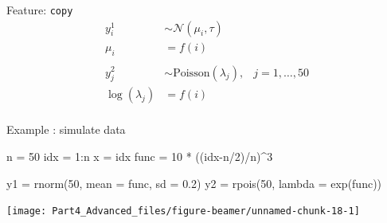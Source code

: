 \documentclass[
  ignorenonframetext,
]{beamer}
\newenvironment{Shaded}{\begin{snugshade}}{\end{snugshade}}
\newcommand{\AttributeTok}[1]{\textcolor[rgb]{0.77,0.63,0.00}{#1}}
\newcommand{\DecValTok}[1]{\textcolor[rgb]{0.00,0.00,0.81}{#1}}
\newcommand{\FloatTok}[1]{\textcolor[rgb]{0.00,0.00,0.81}{#1}}
\newcommand{\FunctionTok}[1]{\textcolor[rgb]{0.00,0.00,0.00}{#1}}
\newcommand{\NormalTok}[1]{#1}
\newcommand{\OtherTok}[1]{\textcolor[rgb]{0.56,0.35,0.01}{#1}}
\newcommand{\SpecialCharTok}[1]{\textcolor[rgb]{0.00,0.00,0.00}{#1}}
\begin{document}
\begin{frame}{Feature: \texttt{copy}}
\protect\hypertarget{feature-copy-4}{}
\[
\begin{aligned}
y^1_i & \sim \mathcal{N}(\mu_i,\tau)\\
\mu_i &= f(i)\\
\\
y^2_j & \sim \text{Poisson}(\lambda_j),& j = 1,\dots,50\\
\log(\lambda_j) &= f(i)\\
\end{aligned}
\]
\end{frame}

\begin{frame}[fragile]{Example : simulate data}
\protect\hypertarget{example-simulate-data-3}{}
\footnotesize

\begin{Shaded}
\begin{Highlighting}[]
\NormalTok{n }\OtherTok{=} \DecValTok{50}
\NormalTok{idx }\OtherTok{=} \DecValTok{1}\SpecialCharTok{:}\NormalTok{n}
\NormalTok{x }\OtherTok{=}\NormalTok{ idx}
\NormalTok{func }\OtherTok{=} \DecValTok{10} \SpecialCharTok{*}\NormalTok{ ((idx}\SpecialCharTok{{-}}\NormalTok{n}\SpecialCharTok{/}\DecValTok{2}\NormalTok{)}\SpecialCharTok{/}\NormalTok{n)}\SpecialCharTok{\^{}}\DecValTok{3}

\NormalTok{y1 }\OtherTok{=} \FunctionTok{rnorm}\NormalTok{(}\DecValTok{50}\NormalTok{, }\AttributeTok{mean =}\NormalTok{ func, }\AttributeTok{sd =} \FloatTok{0.2}\NormalTok{)}
\NormalTok{y2 }\OtherTok{=} \FunctionTok{rpois}\NormalTok{(}\DecValTok{50}\NormalTok{, }\AttributeTok{lambda  =} \FunctionTok{exp}\NormalTok{(func))}
\end{Highlighting}
\end{Shaded}

\begin{center}\texttt{[image: Part4\_Advanced\_files/figure-beamer/unnamed-chunk-18-1]} \end{center}
\normalsize
\end{frame}
\end{document}

